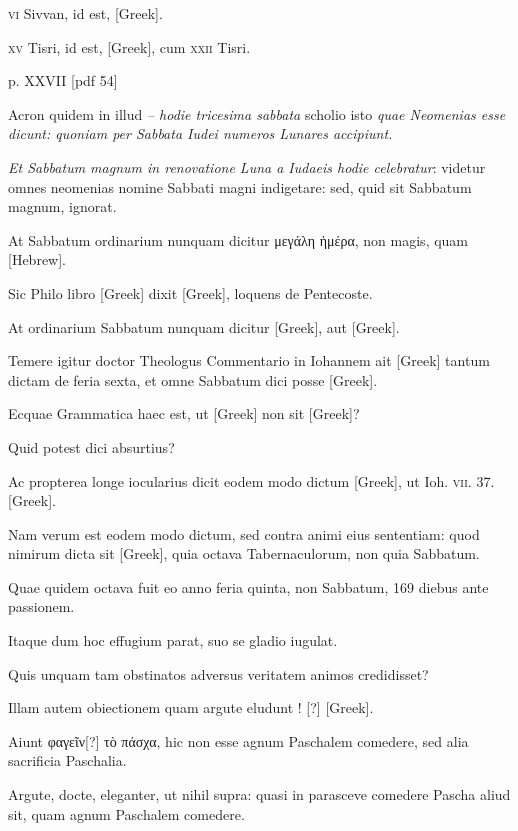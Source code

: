 \begin{parnumbers}
\textsc{vi} Sivvan,
id est, \textgreek{[Greek]}.

\textsc{xv} Tisri, id est, \textgreek{[Greek]}, cum \textsc{xxii} Tisri.

\clearpage
p. XXVII [pdf 54]

Acron quidem in illud \textit{– hodie tricesima sabbata} scholio isto
\textit{quae Neomenias esse dicunt: quoniam per Sabbata Iudei numeros Lunares
accipiunt.}

\textit{Et Sabbatum magnum in renovatione Luna a Iudaeis
hodie celebratur}: videtur omnes neomenias nomine Sabbati
magni indigetare: sed, quid sit Sabbatum magnum, ignorat.

At
Sabbatum ordinarium nunquam dicitur \textgreek{μεγάλη ἡμέρα},
 non magis,
quam \texthebrew{[Hebrew]}.

Sic Philo libro \textgreek{[Greek]} dixit \textgreek{[Greek]},
loquens de Pentecoste.

At ordinarium
Sabbatum nunquam dicitur \textgreek{[Greek]}, aut \textgreek{[Greek]}.

Temere igitur
doctor Theologus Commentario in Iohannem ait \textgreek{[Greek]}
tantum dictam de feria sexta, et omne Sabbatum dici posse \textgreek{[Greek]}.

Ecquae Grammatica haec est, ut \textgreek{[Greek]}
non sit \textgreek{[Greek]}?

Quid potest dici absurtius?

Ac propterea
longe iocularius dicit eodem modo dictum \textgreek{[Greek]},
ut Ioh. \textsc{vii}. 37. \textgreek{[Greek]}.

Nam verum est eodem modo dictum, sed
contra animi eius sententiam: quod nimirum dicta sit \textgreek{[Greek]},
quia octava Tabernaculorum, non quia Sabbatum.

Quae quidem
octava fuit eo anno feria quinta, non Sabbatum, 169 diebus ante
passionem.

Itaque dum hoc effugium parat, suo se gladio iugulat.

Quis unquam tam obstinatos adversus veritatem animos credidisset?

Illam autem obiectionem quam argute eludunt ! [?] \textgreek{[Greek]}.

Aiunt \textgreek{φαγεῖν[?] τὸ πάσχα}, hic non esse
agnum Paschalem comedere, sed alia sacrificia Paschalia.

Argute, docte, eleganter, ut nihil supra: quasi in parasceve comedere
Pascha aliud sit, quam agnum Paschalem comedere.


\end{parnumbers}
